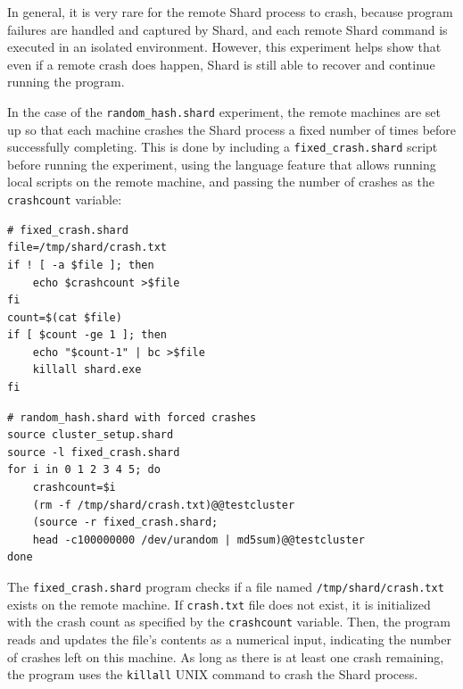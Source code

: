 \documentclass[oneside]{report}
\begin{document}
In general, it is very rare for the remote Shard process to crash, because program failures are handled and captured by Shard, and each remote Shard command is executed in an isolated environment.
However, this experiment helps show that even if a remote crash does happen, Shard is still able to recover and continue running the program.

In the case of the \texttt{random\_hash.shard} experiment, the remote machines are set up so that each machine crashes the Shard process a fixed number of times before successfully completing.
This is done by including a \texttt{fixed\_crash.shard} script before running the experiment, using the language feature that allows running local scripts on the remote machine, and passing the number of crashes as the \texttt{crashcount} variable:

\begin{minipage}[c]{\textwidth-15pt}
  \begin{lstlisting}[language=Shard]
# fixed_crash.shard
file=/tmp/shard/crash.txt
if ! [ -a $file ]; then
    echo $crashcount >$file
fi
count=$(cat $file)
if [ $count -ge 1 ]; then
    echo "$count-1" | bc >$file
    killall shard.exe
fi
\end{lstlisting}
  \smallskip
\end{minipage}

\begin{minipage}[c]{\textwidth-15pt}
  \begin{lstlisting}[language=Shard]
# random_hash.shard with forced crashes
source cluster_setup.shard
source -l fixed_crash.shard
for i in 0 1 2 3 4 5; do
    crashcount=$i
    (rm -f /tmp/shard/crash.txt)@@testcluster
    (source -r fixed_crash.shard;
    head -c100000000 /dev/urandom | md5sum)@@testcluster
done
\end{lstlisting}
  \smallskip
\end{minipage}

The \texttt{fixed\_crash.shard} program checks if a file named \texttt{/tmp/shard/crash.txt} exists on the remote machine.
If \texttt{crash.txt} file does not exist, it is initialized with the crash count as specified by the \texttt{crashcount} variable.
Then, the program reads and updates the file's contents as a numerical input, indicating the number of crashes left on this machine.
As long as there is at least one crash remaining, the program uses the \texttt{killall} UNIX command to crash the Shard process.
\end{document}
